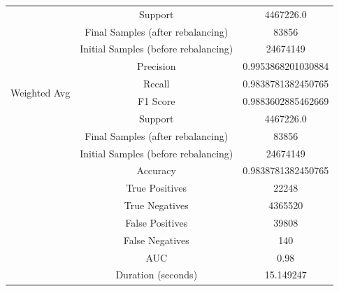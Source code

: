 \begin{longtable}{|c|c|c|}
 & Support & 4467226.0 \\
 & Final Samples (after rebalancing) & 83856 \\
 & Initial Samples (before rebalancing) & 24674149 \\
\hline
\multirow{4}{*}{Weighted Avg} & Precision & 0.9953868201030884 \\
 & Recall & 0.9838781382450765 \\
 & F1 Score & 0.9883602885462669 \\
 & Support & 4467226.0 \\
 & Final Samples (after rebalancing) & 83856 \\
 & Initial Samples (before rebalancing) & 24674149 \\
\hline
& Accuracy & 0.9838781382450765 \\ \hline
& True Positives & 22248 \\ \hline
& True Negatives & 4365520 \\ \hline
& False Positives & 39808 \\ \hline
& False Negatives & 140 \\ \hline
& AUC & 0.98 \\ \hline
& Duration (seconds) & 15.149247 \\ \hline
\end{longtable}


